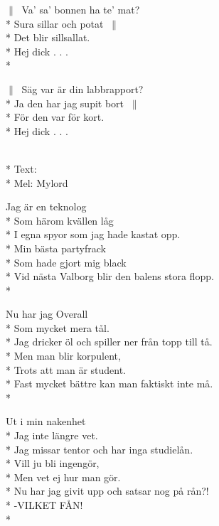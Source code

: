\begin{SongText}[Kalmarevisan]
    \begin{SongVerse}
        $\|\:$ Va’ sa’ bonnen ha te’ mat?\\*%
        Sura sillar och potat $\:\|$\\*%
        Det blir sillsallat.\\*%
        Hej dick . . .\\*%
    \end{SongVerse}
    \begin{SongVerse}
        $\|\:$ Säg var är din labbrapport?\\*%
        Ja den har jag supit bort $\:\|$\\*%
        För den var för kort.\\*%
        Hej dick . . .
    \end{SongVerse}
\end{SongText}
\begin{SongText}
    \begin{SongInfo}
        \\*%
        Text:\\*%
        Mel: Mylord
    \end{SongInfo}
    \begin{SongVerse}
        Jag är en teknolog\\*%
        Som härom kvällen låg\\*%
        I egna spyor som jag hade kastat opp.\\*%
        Min bästa partyfrack\\*%
        Som hade gjort mig black\\*%
        Vid nästa Valborg blir den balens stora
        flopp.\\*%
    \end{SongVerse}
    \begin{SongVerse}
        Nu har jag Overall\\*%
        Som mycket mera tål.\\*%
        Jag dricker öl och spiller ner från topp
        till tå.\\*%
        Men man blir korpulent,\\*%
        Trots att man är student.\\*%
        Fast mycket bättre kan man faktiskt inte
        må.\\*%
    \end{SongVerse}
    \begin{SongVerse}
        Ut i min nakenhet\\*%
        Jag inte längre vet.\\*%
        Jag missar tentor och har inga studielån.\\*%
        Vill ju bli ingengör,\\*%
        Men vet ej hur man gör.\\*%
        Nu har jag givit upp och satsar nog på rån?!\\*%
        -VILKET FÅN!\\*%
    \end{SongVerse}
\end{SongText}
